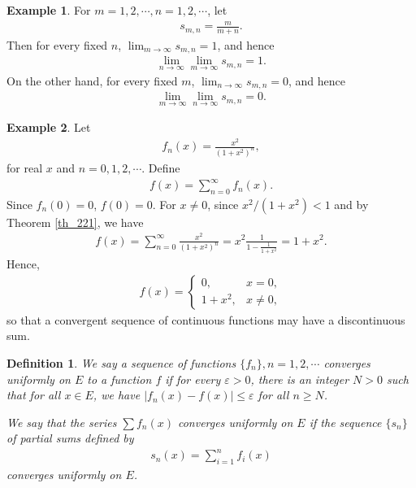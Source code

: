 \documentclass[11pt]{book}
\newtheorem{definition}{Definition}[chapter]
\theoremstyle{definition}
\newtheorem{example}{Example}[chapter]
\numberwithin{equation}{chapter}
\begin{document}
\medskip

\begin{example}
For $m = 1,2,\cdots, n = 1,2,\cdots$, let
\begin{align*}
    s_{m,n} = \frac{m}{m + n}.
\end{align*}
Then for every fixed $n$, $\lim_{m\to\infty} s_{m,n} = 1$, and hence
\begin{align*}
    \lim_{n\to\infty} \lim_{m\to\infty} s_{m,n} = 1.
\end{align*}
On the other hand, for every fixed $m$, $\lim_{n\to\infty} s_{m,n} = 0$, and hence
\begin{align*}
    \lim_{m\to\infty} \lim_{n\to\infty} s_{m,n} = 0.
\end{align*}
\end{example}

\medskip

\begin{example}
Let
\begin{align*}
    f_n(x) = \frac{x^2}{\left(1 + x^2\right)^n},
\end{align*}
for real $x$ and $n = 0,1,2,\cdots$. Define
\begin{align*}
    f(x) = \sum^\infty_{n=0} f_n(x).
\end{align*}
Since $f_n(0) = 0$, $f(0) = 0$. For $x \neq 0$, since $x^2/(1 + x^2) < 1$ and by Theorem \ref{th_221}, we have
\begin{align*}
    f(x) = \sum^\infty_{n=0} \frac{x^2}{\left(1 + x^2\right)^n} = x^2 \frac{1}{1 - \frac{1}{1 + x^2}} = 1 + x^2.
\end{align*}
Hence, 
\begin{align*}
    f(x) = \begin{cases}
        0, & x = 0, \\
        1 + x^2, & x \neq 0,
    \end{cases}
\end{align*}
so that a convergent sequence of continuous functions may have a discontinuous sum.
\end{example}

\medskip

\begin{definition}
We say a sequence of functions $\{f_n\}, n = 1,2,\cdots$ converges uniformly on $E$ to a function $f$ if for every $\varepsilon > 0$, there is an integer $N > 0$ such that for all $x \in E$, we have $\left|f_n(x) - f(x)\right| \leq \varepsilon$ for all $n \geq N$. 

We say that the series $\sum f_n(x)$ converges uniformly on $E$ if the sequence $\{s_n\}$ of partial sums defined by
\begin{align*}
    s_n(x) = \sum^n_{i=1} f_i(x)
\end{align*}
converges uniformly on $E$.
\end{definition}
\end{document}
